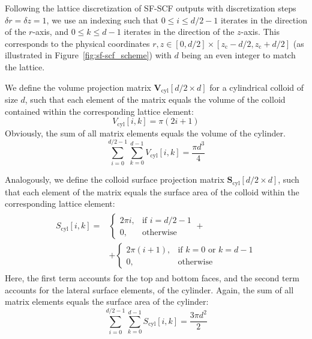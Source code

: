 \documentclass[10pt, a4paper, twocolumn]{article}
\begin{document}
Following the lattice discretization of SF-SCF outputs with discretization steps $\delta r = \delta z = 1$, we use an indexing such that $0 \le i \le d/2-1$ iterates in the direction of the $r$-axis, and $0 \le k \le d-1$ iterates in the direction of the $z$-axis.
This corresponds to the physical coordinates $r,z \in [0, d/2]\times[z_{\text{c}} - d/2, z_{\text{c}} + d/2]$ (as illustrated in Figure~\ref{fig:sf-scf_scheme}) with $d$ being an even integer to match the lattice.

We define the volume projection matrix $\bm{V}_{\text{cyl}}[d/2 \times d]$ for a cylindrical colloid of size $d$, such that each element of the matrix equals the volume of the colloid contained within the corresponding lattice element:
\begin{equation}
    V_{\text{cyl}}[i, k] = \pi(2i + 1)
\end{equation}
Obviously, the sum of all matrix elements equals the volume of the cylinder.
\begin{equation*}
    \sum_{i=0}^{d/2 - 1} \sum_{k=0}^{d - 1} V_{\text{cyl}}[i, k] = \frac{\pi d^3}{4}
\end{equation*}

Analogously, we define the colloid surface projection matrix $\bm{S}_{\text{cyl}}[d/2 \times d]$, such that each element of the matrix equals the surface area of the colloid within the corresponding lattice element:
\begin{align}
    \begin{split}
        S_{\text{cyl}}[i, k] = 
        &\begin{cases}
            2 \pi i,   & \text{if } i = d/2 - 1 \\
            0,         & \text{otherwise}
        \end{cases} +
        \\
        &+
        \begin{cases}
            2 \pi (i + 1), & \text{if } k = 0 \text{ or } k = d - 1 \\
            0,             & \text{otherwise}
        \end{cases}
    \end{split}
\end{align}
Here, the first term accounts for the top and bottom faces, and the second term accounts for the lateral surface elements, of the cylinder.
Again, the sum of all matrix elements equals the surface area of the cylinder:
\begin{equation*}
    \sum_{i=0}^{d/2 - 1} \sum_{k=0}^{d - 1} S_{\text{cyl}}[i, k] = \frac{3 \pi d^2}{2}
\end{equation*}
\end{document}
